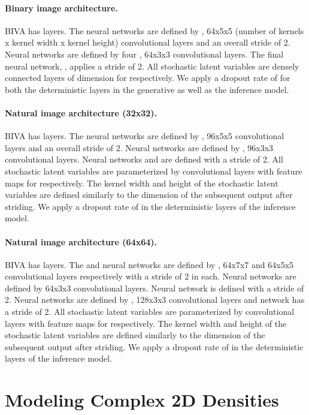 \documentclass{article}
\def\nm{BIVA\xspace}
\begin{document}
\paragraph{Binary image architecture.} \nm has  layers. The  neural networks are defined by , 64x5x5 (number of kernels x kernel width x kernel height) convolutional layers and an overall stride of 2. Neural networks  are defined by four , 64x3x3 convolutional layers. The final neural network, , applies a stride of 2. All stochastic latent variables are densely connected layers of dimension  for  respectively. We apply a dropout rate of  for both the deterministic layers in the generative as well as the inference model.

\paragraph{Natural image architecture (32x32).} \nm has  layers. The  neural networks are defined by , 96x5x5 convolutional layers and an overall stride of 2. Neural networks  are defined by , 96x3x3 convolutional layers. Neural networks  and  are defined with a stride of 2. All stochastic latent variables are parameterized by convolutional layers with  feature maps for  respectively. The kernel width and height of the stochastic latent variables are defined similarly to the dimension of the subsequent output after striding. We apply a dropout rate of  in the deterministic layers of the inference model.

\paragraph{Natural image architecture (64x64).} \nm has  layers. The  and  neural networks are defined by , 64x7x7 and 64x5x5 convolutional layers respectively with a stride of 2 in each. Neural networks  are defined by  64x3x3 convolutional layers. Neural network  is defined with a stride of 2. Neural networks  are defined by , 128x3x3 convolutional layers and network  has a stride of 2. All stochastic latent variables are parameterized by convolutional layers with  feature maps for  respectively. The kernel width and height of the stochastic latent variables are defined similarly to the dimension of the subsequent output after striding. We apply a dropout rate of  in the deterministic layers of the inference model.

\section{Modeling Complex 2D Densities}\label{app:2d_density}
\end{document}
